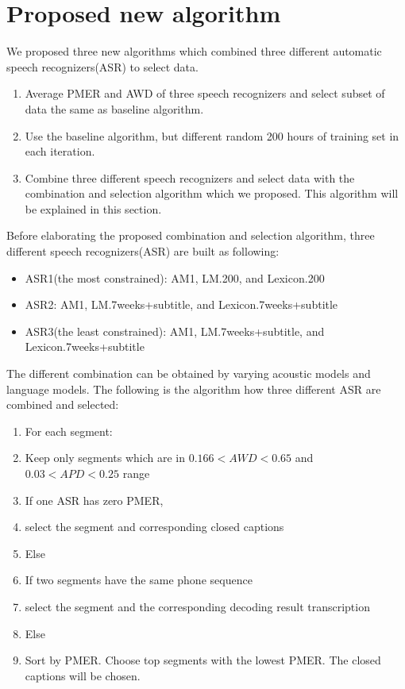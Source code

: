 
\section{Proposed new algorithm}
We proposed three new algorithms which combined three different automatic speech recognizers(ASR) to select data. 
\begin{enumerate}
\item Average PMER and AWD of three speech recognizers and select subset of data the same as baseline algorithm.
\item Use the baseline algorithm, but different random 200 hours of training set in each iteration.
\item Combine three different speech recognizers and select data with the combination and selection algorithm which we proposed. This algorithm will be explained in this section.
\end{enumerate}

Before elaborating the proposed combination and selection algorithm, three different speech recognizers(ASR) are built as following:
\begin{itemize}
\item ASR1(the most constrained): AM1, LM.200, and Lexicon.200
\item ASR2: AM1, LM.7weeks+subtitle, and Lexicon.7weeks+subtitle
\item ASR3(the least constrained): AM1, LM.7weeks+subtitle, and Lexicon.7weeks+subtitle
\end{itemize}


The different combination can be obtained by varying acoustic models and language models. The following is the algorithm how three different ASR are combined and selected:

\begin{enumerate}
\item For each segment:
\item Keep only segments which are in $0.166<AWD<0.65$ and $0.03<APD<0.25$ range
\item  If one ASR has zero PMER,
\item  \tab select the segment and corresponding closed captions
\item  Else 
\item  \tab If two segments have the same phone sequence
\item  \tab \tab select the segment and the corresponding decoding result transcription 
\item \tab Else
\item  \tab \tab  Sort by PMER. Choose top segments with the lowest PMER. The closed captions will be chosen.
\end{enumerate}

